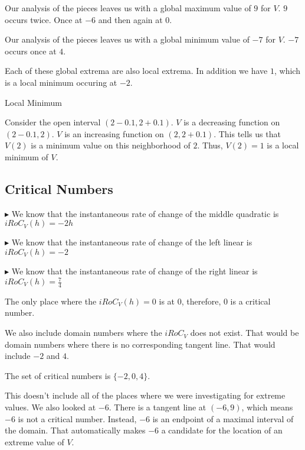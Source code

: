 \documentclass{ximera}
\begin{document}
Our analysis of the pieces leaves us with a global maximum value of $9$ for $V$.  $9$ occurs twice.  Once at $-6$ and then again at $0$.

Our analysis of the pieces leaves us with a global minimum value of $-7$ for $V$. $-7$ occurs once at $4$.



Each of these global extrema are also local extrema.  In addition we have $1$, which is a local minimum occuring at $-2$.  

\begin{explanation} Local Minimum


Consider the open interval $(2 - 0.1, 2 + 0.1)$. $V$ is a decreasing function on $(2 - 0.1, 2)$. $V$ is an increasing function on $(2, 2 + 0.1)$.  This tells us that $V(2)$ is a minimum value on this neighborhood of $2$.  Thus, $V(2)=1$ is a local minimum of $V$.





\end{explanation}









\subsection*{Critical Numbers} 


$\blacktriangleright$ We know that the instantaneous rate of change of the middle quadratic is $iRoC_V(h) = -2h$ 

$\blacktriangleright$ We know that the instantaneous rate of change of the left linear is $iRoC_V(h) = -2$

$\blacktriangleright$ We know that the instantaneous rate of change of the right linear is $iRoC_V(h) = \frac{7}{4}$



The only place where the $iRoC_V(h) = 0$ is at $0$, therefore, $0$ is a critical number.


We also include domain numbers where the $iRoC_V$ does not exist.  That would be domain numbers where there is no corresponding tangent line.  That would include $-2$ and $4$.



The set of critical numbers is $\{ -2, 0, 4 \}$.




This doesn't include all of the places where we were investigating for extreme values. We also looked at $-6$.  There is a tangent line at $(-6, 9)$, which means $-6$ is not a critical number. Instead, $-6$ is an endpoint of a maximal interval of the domain. That automatically makes $-6$ a candidate for the location of an extreme value of $V$.
\end{document}
